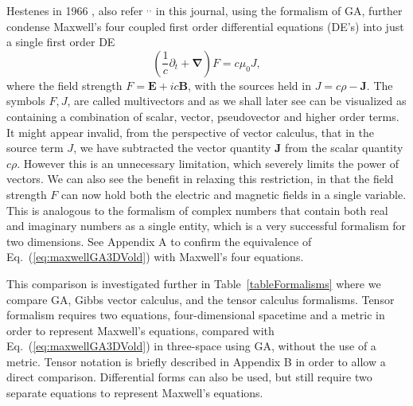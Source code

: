 \documentclass[12pt,aps,prb,preprint]{revtex4}   %
\newcommand{\be}{\begin{equation}}
\newcommand{\ee}{\end{equation}}
\newcommand{\iGA}{{i}}
\begin{document}
Hestenes in 1966 \cite{Hestenes:1966}, also refer \cite{Hestenes:2003}$^,$\cite{Vold:1993}$^,$\cite{Baylis:1994} in this journal, using the formalism of GA, further condense Maxwell's  four coupled first order differential equations (DE's) into just a single first order DE
\be \label{eq:maxwellGA3DVold}
\left (\frac{1}{c} \partial_t + \mathbf{\nabla} \right )  F = c \mu_0 J,
\ee
where the field strength $ F =  \textbf{E} + \iGA c \textbf{B} $, with the sources held in $ J = c \rho -  \textbf{J} $. The symbols $ F, J $, are called multivectors and as we shall later see can be visualized as containing a combination of scalar, vector, pseudovector and higher order terms.  It might appear invalid, from the perspective of vector calculus, that in the source term $ J $, we have subtracted the vector quantity $ \textbf{J} $ from the scalar quantity $ c \rho $. However this is an unnecessary limitation, which severely limits the power of vectors.  We can also see the benefit in relaxing this restriction, in that the field strength $ F $ can now hold both the electric and magnetic fields in a single variable.  This is analogous to the formalism of complex numbers that 
contain both real and imaginary numbers as a single entity, which is a very successful formalism for two dimensions. See Appendix A to confirm the equivalence of Eq.~(\ref{eq:maxwellGA3DVold}) with Maxwell's four equations.   

This comparison is investigated further in Table~\ref{tableFormalisms} where we compare GA, Gibbs vector calculus, and the tensor calculus formalisms.  Tensor formalism requires two equations, four-dimensional spacetime and a metric in order to represent Maxwell's equations, compared with Eq.~(\ref{eq:maxwellGA3DVold}) in three-space using GA, without the use of a metric.  Tensor notation is briefly described in Appendix B in order to allow a direct comparison. Differential forms can also be used, but still require two separate equations to represent Maxwell's equations.
\end{document}
